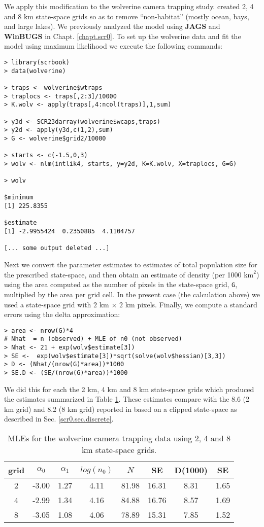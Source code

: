 We apply this modification to the wolverine camera trapping
study. \citet{royle_etal:2011jwm} created 2, 4 and 8 km state-space
grids so as to remove ``non-habitat'' (mostly ocean, bays, and large
lakes). We previously analyzed the model using {\bf JAGS} and {\bf WinBUGS} in
Chapt. \ref{chapt.scr0}.  To set up the wolverine data and fit the
model using maximum likelihood 
we execute the following commands:
{\small 
\begin{verbatim}
> library(scrbook)
> data(wolverine)

> traps <- wolverine$wtraps
> traplocs <- traps[,2:3]/10000
> K.wolv <- apply(traps[,4:ncol(traps)],1,sum)

> y3d <- SCR23darray(wolverine$wcaps,traps)
> y2d <- apply(y3d,c(1,2),sum)
> G <- wolverine$grid2/10000

> starts <- c(-1.5,0,3)
> wolv <- nlm(intlik4, starts, y=y2d, K=K.wolv, X=traplocs, G=G)

> wolv

$minimum
[1] 225.8355

$estimate
[1] -2.9955424  0.2350885  4.1104757

[... some output deleted ...]
\end{verbatim}
}

Next we convert the parameter estimates to estimates of total
population size for the prescribed state-space, and then obtain an
estimate of density (per 1000
$\text{km}^2$) using the area computed as the number of pixels in the
state-space grid, \mbox{\tt G}, multiplied by the area per grid cell. In
the present case (the calculation above) we used a state-space grid
with $2$ km $\times$ $2$ km pixels.  Finally, we compute
a standard errors using the delta approximation: 
\begin{verbatim}
> area <- nrow(G)*4
# Nhat  = n (observed) + MLE of n0 (not observed)
> Nhat <- 21 + exp(wolv$estimate[3])
> SE <-  exp(wolv$estimate[3])*sqrt(solve(wolv$hessian)[3,3])
> D <- (Nhat/(nrow(G)*area))*1000
> SE.D <- (SE/(nrow(G)*area))*1000
\end{verbatim}
We did this for each the 2 km, 4 km and 8 km state-space grids
which produced the estimates summarized in Table \ref{mle.tab.wolv}.
These estimates compare with the 8.6 (2 km grid) and 8.2 (8 km grid)
reported in 
\citet{royle_etal:2011jwm} based on a clipped state-space as described
in Sec. \ref{scr0.sec.discrete}.

\begin{table}
\centering
\caption{MLEs for the wolverine camera trapping data using 2, 4 and 8 km state-space grids.}
\begin{tabular}{cccccccc}
\hline \hline
grid &  $\alpha_0$  &  $\alpha_1$ &   $log(n_0)$  & $N$   &  SE & D(1000) &  SE \\ \hline
2  &  -3.00 & 1.27 &4.11  &81.98& 16.31 &8.31 &1.65\\
4  &  -2.99 & 1.34  &4.16 &84.88& 16.76 &8.57& 1.69\\
8   & -3.05 & 1.08 &4.06  &78.89& 15.31 &7.85& 1.52\\   \hline
\end{tabular}
\label{mle.tab.wolv}
\end{table}



